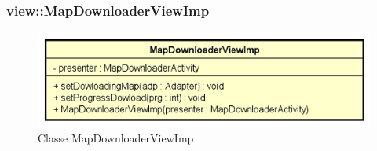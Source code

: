 \documentclass[../DefinizioneDiProdotto.tex]{subfiles}
\begin{document}
\subsubsection{view::MapDownloaderViewImp}

    \begin{figure}[H]
        \centering
        \includegraphics{img/MapDownloaderViewImp.png}
        \caption{Classe MapDownloaderViewImp}\label{fig:view::MapDownloaderViewImp} 
    \end{figure}
\end{document}
